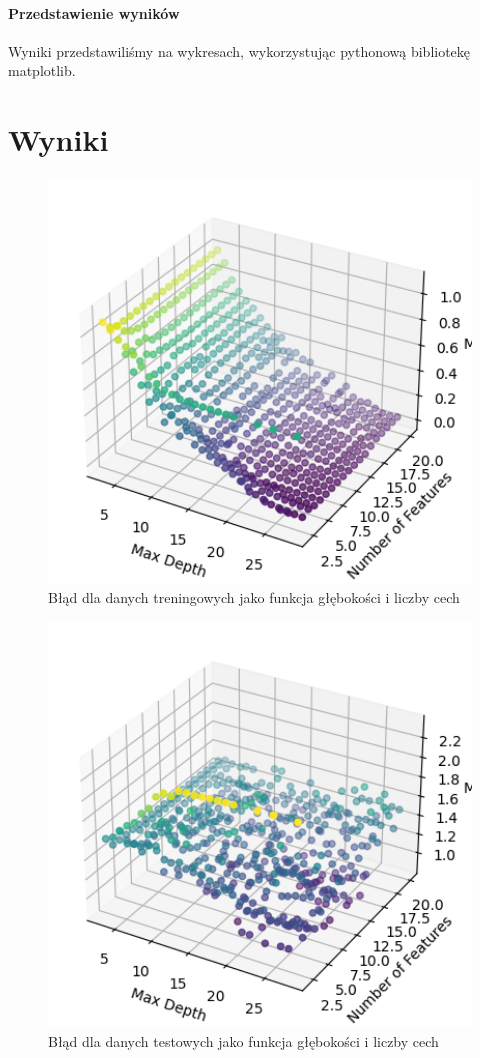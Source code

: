 \documentclass[12pt]{article}
\begin{document}
\paragraph{Przedstawienie wyników}
Wyniki przedstawiliśmy na wykresach, wykorzystując pythonową bibliotekę matplotlib.

\section{Wyniki}
\begin{figure}[H]
\caption{Błąd dla danych treningowych jako funkcja głębokości i liczby cech}
\centering
\includegraphics[width=1.0\textwidth]{output.png}
\end{figure}
\begin{figure}[H]
\caption{Błąd dla danych testowych jako funkcja głębokości i liczby cech}
\centering
\includegraphics[width=1.0\textwidth]{output2.png}
\end{figure}
\end{document}
